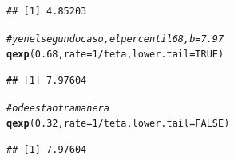 \documentclass[10pt,a4paper]{article}\usepackage[]{graphicx}\usepackage[]{color}
\makeatletter
\newcommand{\hlnum}[1]{\textcolor[rgb]{0.686,0.059,0.569}{#1}}%
\newcommand{\hlcom}[1]{\textcolor[rgb]{0.678,0.584,0.686}{\textit{#1}}}%
\newcommand{\hlopt}[1]{\textcolor[rgb]{0,0,0}{#1}}%
\newcommand{\hlstd}[1]{\textcolor[rgb]{0.345,0.345,0.345}{#1}}%
\newcommand{\hlkwc}[1]{\textcolor[rgb]{0.333,0.667,0.333}{#1}}%
\newcommand{\hlkwd}[1]{\textcolor[rgb]{0.737,0.353,0.396}{\textbf{#1}}}%
\newenvironment{kframe}{%
 \def\at@end@of@kframe{}%
 \ifinner\ifhmode%
  \def\at@end@of@kframe{\end{minipage}}%
  \begin{minipage}{\columnwidth}%
 \fi\fi%
 \def\FrameCommand##1{\hskip\@totalleftmargin \hskip-\fboxsep
 \colorbox{shadecolor}{##1}\hskip-\fboxsep
     \hskip-\linewidth \hskip-\@totalleftmargin \hskip\columnwidth}%
 \MakeFramed {\advance\hsize-\width
   \@totalleftmargin\z@ \linewidth\hsize
   \@setminipage}}%
 {\par\unskip\endMakeFramed%
 \at@end@of@kframe}
\newenvironment{knitrout}{}{} %
\makeatother
\begin{document}
\begin{knitrout}
\begin{kframe}
\begin{alltt}
\end{alltt}
\begin{verbatim}
## [1] 4.85203
\end{verbatim}
\begin{alltt}
\hlcom{#y en el segundo caso, el percentil 68, b = 7.97 }
\hlkwd{qexp}\hlstd{(}\hlnum{0.68}\hlstd{,} \hlkwc{rate}\hlstd{=}\hlnum{1}\hlopt{/}\hlstd{teta,} \hlkwc{lower.tail}\hlstd{=}\hlnum{TRUE}\hlstd{)}
\end{alltt}
\begin{verbatim}
## [1] 7.97604
\end{verbatim}
\begin{alltt}
\hlcom{#o de esta otra manera }
\hlkwd{qexp}\hlstd{(}\hlnum{0.32}\hlstd{,} \hlkwc{rate}\hlstd{=}\hlnum{1}\hlopt{/}\hlstd{teta,} \hlkwc{lower.tail}\hlstd{=}\hlnum{FALSE}\hlstd{)}
\end{alltt}
\begin{verbatim}
## [1] 7.97604
\end{verbatim}
\end{kframe}
\end{knitrout}
\end{document}
